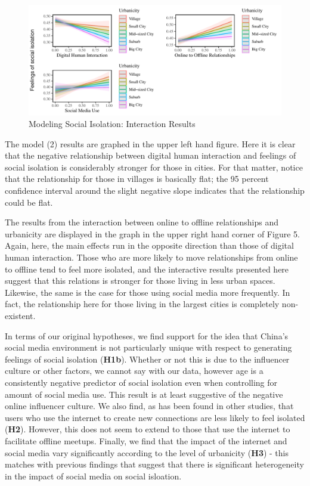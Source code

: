 \documentclass[]{interact}
\theoremstyle{plain}%
\theoremstyle{definition}
\theoremstyle{remark}
\begin{document}
\begin{figure}

{\centering \includegraphics{Social-Isolation-in-China-jg-revised_files/figure-pdf/fig-social-isolation-interactions-1.pdf}

}

\caption{\label{fig-social-isolation-interactions}Modeling Social
Isolation: Interaction Results}

\end{figure}

The model (2) results are graphed in the upper left hand figure. Here it
is clear that the negative relationship between digital human
interaction and feelings of social isolation is considerably stronger
for those in cities. For that matter, notice that the relationship for
those in villages is basically flat; the 95 percent confidence interval
around the slight negative slope indicates that the relationship could
be flat.

The results from the interaction between online to offline relationships
and urbanicity are displayed in the graph in the upper right hand corner
of Figure 5. Again, here, the main effects run in the opposite direction
than those of digital human interaction. Those who are more likely to
move relationships from online to offline tend to feel more isolated,
and the interactive results presented here suggest that this relations
is stronger for those living in less urban spaces. Likewise, the same is
the case for those using social media more frequently. In fact, the
relationship here for those living in the largest cities is completely
non-existent.

In terms of our original hypotheses, we find support for the idea that
China's social media environment is not particularly unique with respect
to generating feelings of social isolation (\textbf{H1b}). Whether or
not this is due to the influencer culture or other factors, we cannot
say with our data, however age is a consistently negative predictor of
social isolation even when controlling for amount of social media use.
This result is at least suggestive of the negative online influencer
culture. We also find, as has been found in other studies, that users
who use the internet to create new connections are less likely to feel
isolated (\textbf{H2}). However, this does not seem to extend to those
that use the internet to facilitate offline meetups. Finally, we find
that the impact of the internet and social media vary significantly
according to the level of urbanicity (\textbf{H3}) - this matches with
previous findings that suggest that there is significant heterogeneity
in the impact of social media on social isloation.
\end{document}
